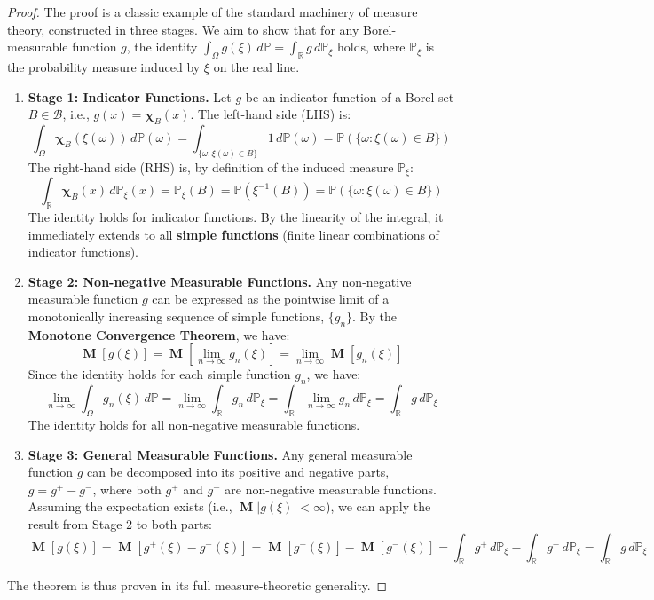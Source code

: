 \documentclass[12pt, openany]{book}
\theoremstyle{definition}
\theoremstyle{plain}
\theoremstyle{remark}
\newcommand{\R}{\mathbb{R}}
\newcommand{\B}{\mathcal{B}}
\newcommand{\probP}{\mathbb{P}}
\DeclareMathOperator{\E}{\mathbf{M}} %
\begin{document}
\begin{proof}
The proof is a classic example of the standard machinery of measure theory, constructed in three stages. We aim to show that for any Borel-measurable function $g$, the identity $\int_{\Omega} g(\xi) \,d\probP = \int_{\R} g \,d\probP_\xi$ holds, where $\probP_\xi$ is the probability measure induced by $\xi$ on the real line.

\begin{enumerate}
    \item \textbf{Stage 1: Indicator Functions.} Let $g$ be an indicator function of a Borel set $B \in \B$, i.e., $g(x) = \mathbf{\chi}_B(x)$. The left-hand side (LHS) is:
    $$ \int_{\Omega} \mathbf{\chi}_B(\xi(\omega)) \,d\probP(\omega) = \int_{\{\omega : \xi(\omega) \in B\}} 1 \,d\probP(\omega) = \probP(\{\omega : \xi(\omega) \in B\}) $$
    The right-hand side (RHS) is, by definition of the induced measure $\probP_\xi$:
    $$ \int_{\R} \mathbf{\chi}_B(x) \,d\probP_\xi(x) = \probP_\xi(B) = \probP(\xi^{-1}(B)) = \probP(\{\omega : \xi(\omega) \in B\}) $$
    The identity holds for indicator functions. By the linearity of the integral, it immediately extends to all \textbf{simple functions} (finite linear combinations of indicator functions).

    \item \textbf{Stage 2: Non-negative Measurable Functions.} Any non-negative measurable function $g$ can be expressed as the pointwise limit of a monotonically increasing sequence of simple functions, $\{g_n\}$. By the \textbf{Monotone Convergence Theorem}, we have:
    $$ \E[g(\xi)] = \E[\lim_{n\to\infty} g_n(\xi)] = \lim_{n\to\infty} \E[g_n(\xi)] $$
    Since the identity holds for each simple function $g_n$, we have:
    $$ \lim_{n\to\infty} \int_{\Omega} g_n(\xi) \,d\probP = \lim_{n\to\infty} \int_{\R} g_n \,d\probP_\xi = \int_{\R} \lim_{n\to\infty} g_n \,d\probP_\xi = \int_{\R} g \,d\probP_\xi $$
    The identity holds for all non-negative measurable functions.

    \item \textbf{Stage 3: General Measurable Functions.} Any general measurable function $g$ can be decomposed into its positive and negative parts, $g = g^+ - g^-$, where both $g^+$ and $g^-$ are non-negative measurable functions. Assuming the expectation exists (i.e., $\E|g(\xi)| < \infty$), we can apply the result from Stage 2 to both parts:
    $$ \E[g(\xi)] = \E[g^+(\xi) - g^-(\xi)] = \E[g^+(\xi)] - \E[g^-(\xi)] = \int_{\R} g^+ \,d\probP_\xi - \int_{\R} g^- \,d\probP_\xi = \int_{\R} g \,d\probP_\xi $$
\end{enumerate}
The theorem is thus proven in its full measure-theoretic generality.
\end{proof}
\end{document}
